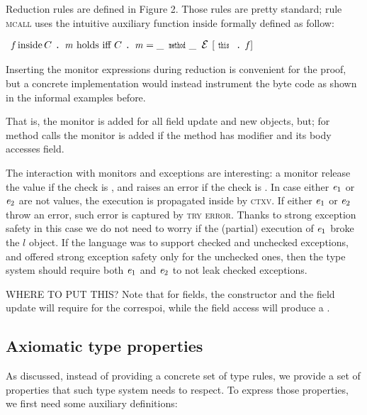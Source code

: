 Reduction rules are defined in Figure 2.
Those rules are pretty standard;
rule \textsc{mcall}
uses the intuitive auxiliary function $\text{inside}$
formally defined as follow:

\noindent $\begin{array}{l}
\f\, \text{inside}\, C\singleDot\m\text{ holds iff }
C\singleDot\m=\_\,\Kw{method}\_\,\ctx[\Kw{this}\singleDot\f]
\end{array}$

\noindent Inserting the monitor expressions during reduction is convenient for the proof,
but a concrete implementation would
instead instrument the byte code as shown in the informal examples before.

That is, the monitor is added for all field update and new objects, but;
for method calls the monitor is added if the method has \Q@mut@ modifier and its body accesses \Q@capsule@ field.

The interaction with monitors and exceptions are interesting:
a monitor release the value if the check is \Q@true@, and raises an error if the 
check is \Q@false@.
In case either ${\mathit{e}}_1$ or ${\mathit{e}}_2$ are not values, the execution is propagated inside
by \textsc{ctxv}.
If either ${\mathit{e}}_1$ or ${\mathit{e}}_2$ throw an error, such error is captured by 
\textsc{try error}.
Thanks to strong exception safety
in this case we do not need to worry
if the (partial) execution of ${\mathit{e}}_1$ broke the $l$ object.
If the language was to support checked and unchecked exceptions, and offered 
strong exception safety only for the unchecked ones, then 
the type system should require both ${\mathit{e}}_1$ and ${\mathit{e}}_2$ to not leak 
checked exceptions.





WHERE TO PUT THIS?
Note that for \Q@capsule@ fields, the constructor and the field update
will require \Q@capsule@ for the correspoi, while the field access will produce a \Q@mut@.



\subsection{Axiomatic type properties}

As discussed, instead of providing a concrete set of type rules, we provide a set of properties
that such type system needs to respect.
To express those properties, we first need some auxiliary definitions:



